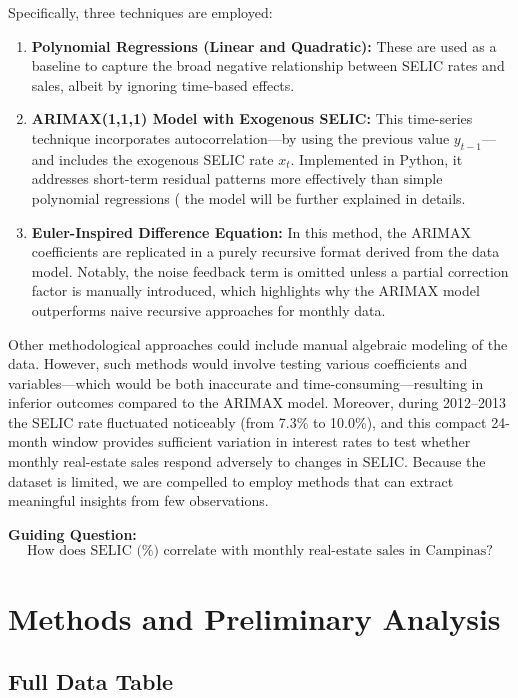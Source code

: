 \documentclass[10pt]{article}
\begin{document}
Specifically, three techniques are employed:
\begin{enumerate}
    \item \textbf{Polynomial Regressions (Linear and Quadratic):} These are used as a baseline to capture the broad negative relationship between SELIC rates and sales, albeit by ignoring time-based effects.
    \item \textbf{ARIMAX(1,1,1) Model with Exogenous SELIC:} This time-series technique incorporates autocorrelation—by using the previous value \(y_{t-1}\)—and includes the exogenous SELIC rate \(x_t\). Implemented in Python, it addresses short-term residual patterns more effectively than simple polynomial regressions ( the model will be further explained in details.
    \item \textbf{Euler-Inspired Difference Equation:} In this method, the ARIMAX coefficients are replicated in a purely recursive format derived from the data model. Notably, the noise feedback term is omitted unless a partial correction factor is manually introduced, which highlights why the ARIMAX model outperforms naive recursive approaches for monthly data.
\end{enumerate}

Other methodological approaches could include manual algebraic modeling of the data. However, such methods would involve testing various coefficients and variables—which would be both inaccurate and time-consuming—resulting in inferior outcomes compared to the ARIMAX model. Moreover, during 2012–2013 the SELIC rate fluctuated noticeably (from 7.3\% to 10.0\%), and this compact 24-month window provides sufficient variation in interest rates to test whether monthly real-estate sales respond adversely to changes in SELIC. Because the dataset is limited, we are compelled to employ methods that can extract meaningful insights from few observations.

\textbf{Guiding Question:}
\[
\text{How does SELIC (\%) correlate with monthly real-estate sales in Campinas?}
\]

\section{Methods and Preliminary Analysis}
\label{sec:rawdata}

\subsection{Full Data Table}
\end{document}
